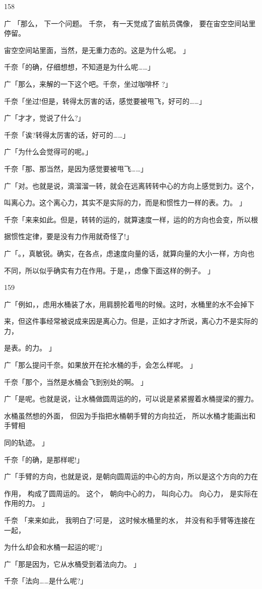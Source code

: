 158\par
广 「那么， 下一个问题。 千奈， 有一天觉成了宙航员偶像， 要在宙空空间站里停留。\par
宙空空间站里面，当然，是无重力态的。这是为什么呢。 」\par
千奈「的确，仔细想想，不知道是为什么呢……」\par
广「那么，来解的一下这个吧。千奈，坐过咖啡杯 ?」\par
千奈「坐过!但是，转得太厉害的话，感觉要被甩飞，好可的……」\par
广「才才，觉说了什么?」\par
千奈「诶?转得太厉害的话，好可的……」\par
广「为什么会觉得可的呢。」\par
千奈「那、那当然，是因为感觉要被甩飞……」\par
广「对。也就是说，滴溜溜一转，就会在远离转转中心的方向上感觉到力。这个，\par
叫离心力。这个离心力，其实不是实际的力，而是和惯性力一样的表。力。 」\par
千奈「来来如此。但是，转转的运的，就算速度一样，运的的方向也会变，所以根\par
据惯性定律，要是没有力作用就奇怪了!」\par
广「。，真敏锐。确实，在各点，虑速度向量的话，就算向量的大小一样，方向也\par
不同，所以似乎确实有力在作用。于是，，虑像下面这样的例子。 」\par

159\par
广「例如，，虑用水桶装了水，用肩膀抡着甩的时候。这时，水桶里的水不会掉下\par
来，但这件事经常被说成来因是离心力。但是，正如才才所说，离心力不是实际的力，\par
是表。的力。 」\par
广「那么提问千奈。如果放开在抡水桶的手，会怎么样呢。 」\par
千奈「那个，当然是水桶会飞到别处的啊。 」\par
广「是呢。也就是说，让水桶做圆周运的的，可以说是紧紧握着水桶提梁的握力。\par
水桶虽然想的外面， 但因为手指把水桶朝手臂的方向拉近， 所以水桶才能画出和手臂相\par
同的轨迹。 」\par
千奈「的确，是那样呢!」\par
广「手臂的方向，也就是说，是朝向圆周运的中心的方向，所以是这个方向的力在\par
作用， 构成了圆周运的。 这个， 朝向中心的力， 叫向心力。 向心力， 是实际在作用的力。 」\par
千奈 「来来如此， 我明白了!可是， 这时候水桶里的水， 并没有和手臂等连接在一起，\par
为什么却会和水桶一起运的呢?」\par
广「那是因为，它从水桶受到着法向力。 」\par
千奈「法向……是什么呢?」\par

